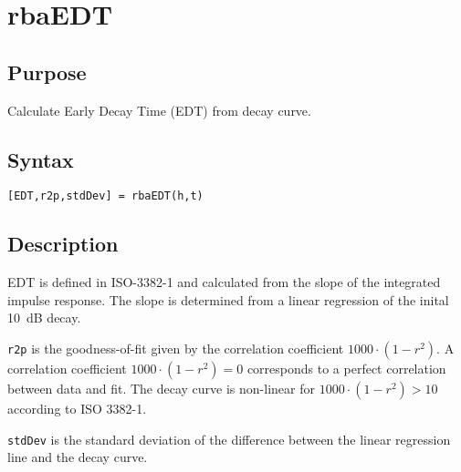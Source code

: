 
\chapter{rbaEDT} %
\label{cha:rbaEDT} %

\section{Purpose} %
\label{sec:rbaEDT_purpose}
Calculate Early Decay Time (EDT) from decay curve.


\section{Syntax} %
\label{sec:rbaEDT_syntax}

\texttt{[EDT,r2p,stdDev] = rbaEDT(h,t)}




\section{Description} %
\label{sec:rbaEDT_description}

EDT is defined in ISO-3382-1 and calculated from the slope of the integrated impulse response. The slope is determined from a linear regression of the inital 10~dB decay.

\texttt{r2p} is the goodness-of-fit given by the correlation coefficient $1000\cdot(1-r^2)$.
A correlation coefficient $1000\cdot(1-r^2) = 0$ corresponds to a perfect correlation between data and fit. The decay curve is non-linear for $1000\cdot(1-r^2) > 10$ according to ISO 3382-1.

\texttt{stdDev} is the standard deviation of the difference between the linear regression line and the decay curve.


